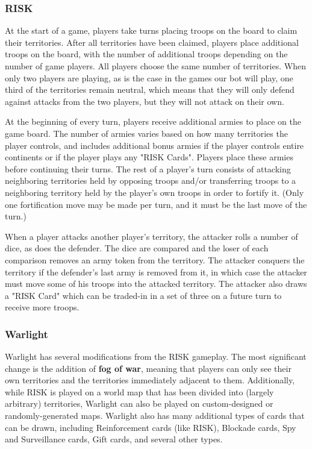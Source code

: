 \documentclass[a4paper,11pt]{article}
\begin{document}
\subsubsection{RISK}
At the start of a game, players take turns placing troops on the board to claim
their territories.  After all territories have been claimed, players place
additional troops on the board, with the number of additional troops depending on
the number of game players.  All players choose the same number of territories.
When only two players are playing, as is the case in the games our bot will play,
one third of the territories remain neutral, which means that they will only defend
against attacks from the two players, but they will not attack on their own.

At the beginning of every turn, players receive additional armies to place on the 
game board.  The number of armies varies based on how many territories the player 
controls, and includes additional bonus armies if the player controls entire 
continents or if the player plays any "RISK Cards".  Players place these armies 
before continuing their turns.  The rest of 
a player's turn consists of attacking neighboring territories held by opposing 
troops and/or transferring troops to a neighboring territory held by the player's 
own troops in order to fortify it. (Only one fortification move may be made per 
turn, and it must be the last move of the turn.)

When a player attacks another player's territory, the attacker rolls a number of 
dice, as does the defender.  The dice are compared and the loser of each comparison 
removes an army token from the territory.  The attacker conquers the territory if 
the defender's last army is removed from it, in which case the attacker must move 
some of his troops into the attacked territory.  The attacker also draws a "RISK 
Card" which can be traded-in in a set of three on a future turn to receive more 
troops.

\subsubsection{Warlight}
Warlight has several modifications from the RISK gameplay.  The most significant 
change is the addition of \textbf{fog of war}, meaning that players can only see 
their own territories and the territories immediately adjacent to them.  
Additionally, while RISK is played on a world map that has been divided into 
(largely arbitrary) territories, Warlight can also be played on custom-designed or 
randomly-generated maps.  Warlight also has many additional types of cards that can 
be drawn, including Reinforcement cards (like RISK), Blockade cards, Spy and 
Surveillance cards, Gift cards, and several other types.
\end{document}
